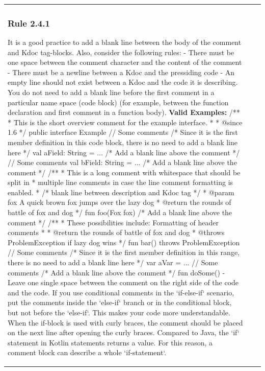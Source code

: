 \begin{center}
\begin{tabular}{ |p{}|p{}|p{}| }
\subsubsection*{\textbf{Rule 2.4.1}}
It is a good practice to add a blank line between the body of the comment and Kdoc tag-blocks. Also, consider the following rules:
- There must be one space between the comment character and the content of the comment
- There must be a newline between a Kdoc and the pressiding code
- An empty line should not exist between a Kdoc and the code it is describing. You do not need to add a blank line before the first comment in a particular name space (code block) (for example, between the function declaration and first comment in a function body).
\textbf{Valid Examples:}
/**
 * This is the short overview comment for the example interface.
 *
 * @since 1.6
 */
 public interface Example {
    // Some comments  /* Since it is the first member definition in this code block, there is no need to add a blank line here */
    val aField: String = ...
                     /* Add a blank line above the comment */
    // Some comments
    val bField: String = ...
                      /* Add a blank line above the comment */
    /**
     * This is a long comment with whitespace that should be split in
     * multiple line comments in case the line comment formatting is enabled.
     *                /* blank line between description and Kdoc tag */
     * @param fox A quick brown fox jumps over the lazy dog
     * @return the rounds of battle of fox and dog
     */
    fun foo(Fox fox)
                      /* Add a blank line above the comment */
     /**
      * These possibilities include: Formatting of header comments
      *
      * @return the rounds of battle of fox and dog
      * @throws ProblemException if lazy dog wins
      */
    fun bar() throws ProblemException {
        // Some comments  /* Since it is the first member definition in this range, there is no need to add a blank line here */
        var aVar = ...
        // Some comments  /* Add a blank line above the comment */
        fun doSome()
    }
 }
- Leave one single space between the comment on the right side of the code and the code.
If you use conditional comments in the `if-else-if` scenario, put the comments inside the `else-if` branch or in the conditional block, but not before the `else-if`. This makes your code more understandable.
When the if-block is used with curly braces, the comment should be placed on the next line after opening the curly braces.
Compared to Java, the `if` statement in Kotlin statements returns a value. For this reason, a comment block can describe a whole `if-statement`.

\end{tabular}
\end{center}
